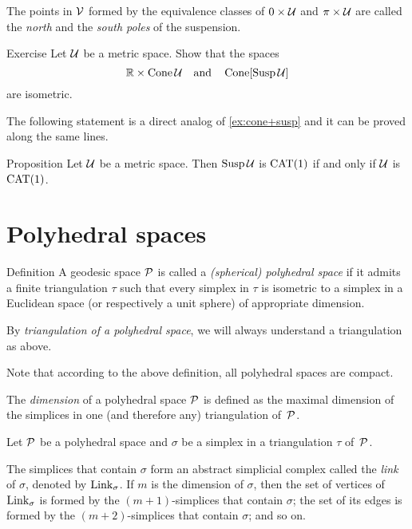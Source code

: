 The points in $\mathcal{V}$ formed by the equivalence classes of $0\times\mathcal{U}$ and $\pi\times\mathcal{U}$ are called  the {}\emph{north} and the \emph{south poles} of the suspension.

\begin{thm}{Exercise}\label{ex:product-cone}
Let $\mathcal{U}$ be a metric space.
Show that the spaces 
\[\mathbb{R}\times \mathop{\rm Cone}\nolimits\mathcal{U}\quad\text{and}\quad\mathop{\rm Cone}\nolimits[\mathop{\rm Susp}\nolimits\mathcal{U}]\]
are  isometric.
\end{thm}

The following statement is a direct analog of \ref{ex:cone+susp} and it can be proved along the same lines.

\begin{thm}{Proposition}\label{prop:susp}
Let $\mathcal{U}$ be a metric space.
Then $\mathop{\rm Susp}\nolimits\mathcal{U}$ is  $\mathrm{CAT}(1)$ if and only if $\mathcal{U}$ is $\mathrm{CAT}(1)$.
\end{thm}

\section{Polyhedral spaces}

\begin{thm}{Definition}\label{def:poly}
A geodesic space $\mathcal{P}$ is called  
a \emph{(spherical) polyhedral space} 
if it admits a finite triangulation $\tau$ 
such that every simplex in $\tau$ is isometric to a simplex in a Euclidean space (or respectively a unit sphere) of appropriate dimension.

By \emph{triangulation of a polyhedral space}, 
we will always understand a triangulation as above. 
\end{thm}

Note that according to the above definition,
all polyhedral spaces are compact.

The \emph{dimension} of a polyhedral space $\mathcal{P}$
is defined as the maximal dimension of the simplices 
in one (and therefore any) triangulation of~$\mathcal{P}$.

Let $\mathcal{P}$ be a polyhedral space
and $\sigma$ be a simplex in a triangulation $\tau$ of~$\mathcal{P}$.

The simplices that  contain $\sigma$
form an abstract simplicial complex called the \emph{link} of $\sigma$, 
denoted by $\mathop{\rm Link}\nolimits_\sigma$.
If $m$ is  the dimension of $\sigma$,
then the set of vertices of $\mathop{\rm Link}\nolimits_\sigma$
is formed by the $(m+1)$-simplices that  contain $\sigma$;
the set of its edges is formed by the $(m+2)$-simplices 
that contain $\sigma$; and so on.

